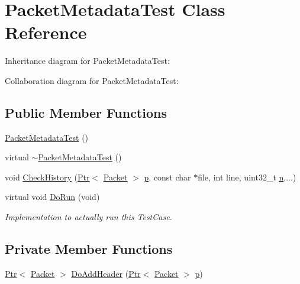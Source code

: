 \hypertarget{classPacketMetadataTest}{}\section{Packet\+Metadata\+Test Class Reference}
\label{classPacketMetadataTest}


Inheritance diagram for Packet\+Metadata\+Test\+:


Collaboration diagram for Packet\+Metadata\+Test\+:
\subsection*{Public Member Functions}
\begin{DoxyCompactItemize}
\item 
\hyperlink{classPacketMetadataTest_ac0208ad5e22f4455f5f1d2b7d16b1eb4}{Packet\+Metadata\+Test} ()
\item 
virtual \hyperlink{classPacketMetadataTest_aef57d37a23f1f326b54fef012871d274}{$\sim$\+Packet\+Metadata\+Test} ()
\item 
void \hyperlink{classPacketMetadataTest_a22fae7ba6557ced42238625fc0ccc623}{Check\+History} (\hyperlink{classns3_1_1Ptr}{Ptr}$<$ \hyperlink{classns3_1_1Packet}{Packet} $>$ \hyperlink{lte__link__budget__x2__handover__measures_8m_ac9de518908a968428863f829398a4e62}{p}, const char $\ast$file, int line, uint32\+\_\+t \hyperlink{lte__link__budget__x2__handover__measures_8m_abdb05bc5a064cf642a06c83b3392f148}{n},...)
\item 
virtual void \hyperlink{classPacketMetadataTest_a5157cf5ecf0e631ad2a70c61375ebfc3}{Do\+Run} (void)
\begin{DoxyCompactList}\small\item\em Implementation to actually run this Test\+Case. \end{DoxyCompactList}\end{DoxyCompactItemize}
\subsection*{Private Member Functions}
\begin{DoxyCompactItemize}
\item 
\hyperlink{classns3_1_1Ptr}{Ptr}$<$ \hyperlink{classns3_1_1Packet}{Packet} $>$ \hyperlink{classPacketMetadataTest_a311c0830c6c28e6430961fc5d5a05cc8}{Do\+Add\+Header} (\hyperlink{classns3_1_1Ptr}{Ptr}$<$ \hyperlink{classns3_1_1Packet}{Packet} $>$ \hyperlink{lte__link__budget__x2__handover__measures_8m_ac9de518908a968428863f829398a4e62}{p})
\end{DoxyCompactItemize}
